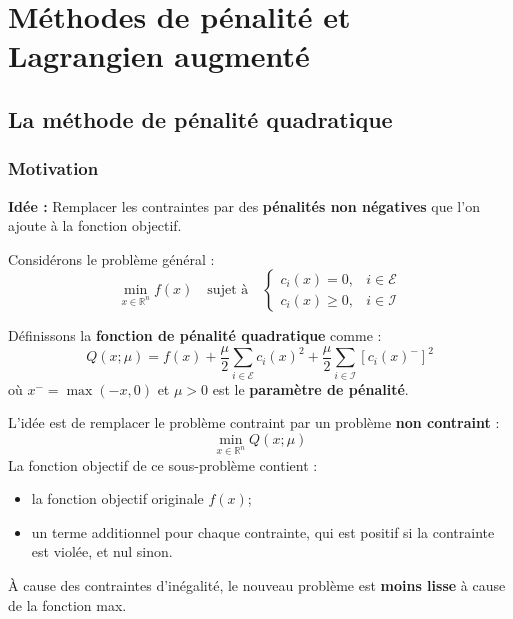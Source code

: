 \chapter{Méthodes de pénalité et Lagrangien augmenté}
\label{chap:penalty-augmented-lagrangian}

\section{La méthode de pénalité quadratique}

\subsection{Motivation}

\textbf{Idée :} Remplacer les contraintes par des \textbf{pénalités non négatives} que l'on ajoute à la fonction objectif.

Considérons le problème général :
\begin{equation}
    \min_{x \in \mathbb{R}^n} f(x) \quad \text{sujet à} \quad
    \begin{cases}
        c_i(x) = 0, & i \in \mathcal{E} \\
        c_i(x) \ge 0, & i \in \mathcal{I}
    \end{cases}
\end{equation}

Définissons la \textbf{fonction de pénalité quadratique} comme :
\begin{equation}
    Q(x; \mu) = f(x) + \frac{\mu}{2} \sum_{i \in \mathcal{E}} c_i(x)^2 + \frac{\mu}{2} \sum_{i \in \mathcal{I}} \left[ c_i(x)^- \right]^2
\end{equation}
où $x^- = \max(-x, 0)$ et $\mu > 0$ est le \textbf{paramètre de pénalité}.

L'idée est de remplacer le problème contraint par un problème \textbf{non contraint} :
\begin{equation}
    \min_{x \in \mathbb{R}^n} Q(x; \mu)
\end{equation}
La fonction objectif de ce sous-problème contient :
\begin{itemize}
    \item la fonction objectif originale $f(x)$;
    \item un terme additionnel pour chaque contrainte, qui est positif si la contrainte est violée, et nul sinon.
\end{itemize}

\begin{remarque}
    À cause des contraintes d'inégalité, le nouveau problème est \textbf{moins lisse} à cause de la fonction max.
\end{remarque}

